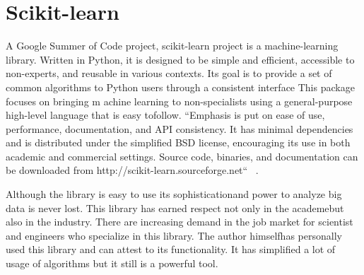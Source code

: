 \section{Scikit-learn}

A Google Summer of Code project, 
scikit-learn project is a
machine-learning library.  
Written in Python, it is designed to be
simple and efficient, accessible to 
non-experts, and reusable in
various contexts. Its goal is to provide a 
set of common algorithms to
Python users through a consistent interface
This package focuses on bringing m
achine learning to non-specialists
using a general-purpose high-level 
language that is easy tofollow. 
``Emphasis is put on ease of use, performance, 
documentation, and API consistency. 
It has minimal dependencies and is distributed
under the simplified BSD license, 
encouraging its use in both academic
and commercial settings. Source code, 
binaries, and documentation can
be downloaded from http://scikit-learn.sourceforge.net``
~\cite{hid-sp18-506-Scikit-learn}.

	
Although the library is easy to use its 
sophisticationand power to analyze big data 
is never lost. This library has earned respect 
not only in the academebut also in the 
industry. There are increasing demand in the
job market for scientist and engineers
who specialize in this library. The author 
himselfhas personally used this library and 
can attest to its functionality. It has 
simplified a lot of usage of algorithms but
it still is a powerful tool.
